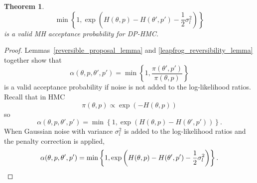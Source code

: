 \documentclass[english,twoside,openright]{HYgraduMLDS}
\newtheorem{theorem}{Theorem}
\newcommand{\R}{\mathbb{R}}
\newcommand{\dx}{\mathrm{d}}
\begin{document}
\begin{theorem}
  \[
    \min\left\{1, \exp\left(H(\theta, p)
        - H(\theta', p') - \frac{1}{2}\sigma_{l}^{2}\right)\right\}
  \]
  is a valid MH acceptance probability for DP-HMC.
\end{theorem}
\begin{proof}
Lemmas~\ref{reversible_proposal_lemma} and \ref{leapfrog_reversibility_lemma}
together show that
\[
  \alpha(\theta, p, \theta', p')
  = \min\left\{1, \frac{\pi(\theta', p')}{\pi(\theta, p)}\right\}
\]
is a valid acceptance probability if noise is not added to the log-likelihood
ratios. Recall that in HMC
\[
  \pi(\theta, p) \propto \exp(-H(\theta, p))
\]
so
\[
  \alpha(\theta, p, \theta', p')
  = \min\left\{1, \exp\left(H(\theta, p) - H(\theta', p')\right)\right\}.
\]
When Gaussian noise with variance \(\sigma_{l}^{2}\) is added to the
log-likelihood ratios and the penalty correction is applied,
  \[
    \alpha(\theta, p, \theta', p')
    = \min\left\{1, \exp\left(H(\theta, p)
        - H(\theta', p') - \frac{1}{2}\sigma_{l}^{2}\right)\right\}.
    \qedhere
  \]
\end{proof}



\end{document}
